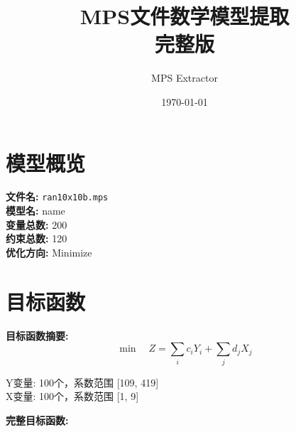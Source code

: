 \documentclass[a4paper,10pt]{article}
\title{MPS文件数学模型提取\\{\large 完整版}}
\author{MPS Extractor}
\date{\today}
\begin{document}
\maketitle
\tableofcontents
\newpage

\section{模型概览}

\textbf{文件名:} \texttt{ran10x10b.mps} \\
\textbf{模型名:} name \\
\textbf{变量总数:} 200 \\
\textbf{约束总数:} 120 \\
\textbf{优化方向:} Minimize \\

\section{目标函数}

\textbf{目标函数摘要:}
\begin{equation}
\min \quad Z = \sum_{i} c_i Y_i + \sum_{j} d_j X_j
\end{equation}

Y变量: 100个，系数范围 [109, 419] \\
X变量: 100个，系数范围 [1, 9]

\textbf{完整目标函数:}
\end{document}
